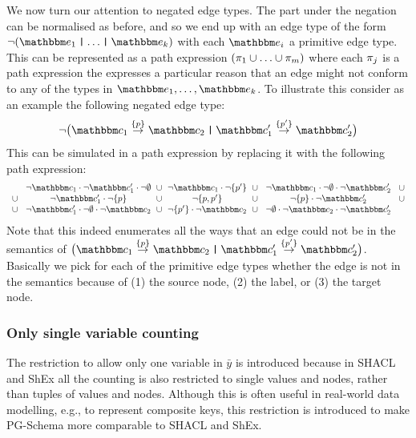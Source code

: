 We now turn our attention to negated edge types. The part under the negation can be normalised as before,
and so we end up with an edge type of the form $\neg (\etype_1 \tOr \ldots \tOr \etype_k)$ with each $\etype_i$ a primitive edge type.
This can be represented as a path expression $(\pi_1 \cup \ldots \cup \pi_{m})$ where each $\pi_j$ is a path expression the expresses a particular reason that an edge might not conform to any of the types in $\etype_1, \ldots, \etype_k$.
To illustrate this consider as an example the following negated edge type:
\[\lnot \big( \et{\ntype_1}{\{ p \}}{\ntype_2} \tOr \et{\ntype'_1}{\{ p' \}}{\ntype'_2} \big)\]
This can be simulated in a path expression by replacing it with the following path expression:
\[\begin{array}{c@{\hspace{6pt}}c@{\hspace{6pt}}c@{\hspace{6pt}}c@{\hspace{6pt}}c@{\hspace{6pt}}c@{\hspace{6pt}}c}
& \lnot\ntype_1\cdot \lnot\ntype'_1 \cdot \lnot\emptyset & \cup &
 \lnot\ntype_1 \cdot \lnot\{p'\} & \cup &
 \lnot\ntype_1 \cdot \lnot\emptyset \cdot \lnot\ntype'_2 & \cup\\
\cup\;  & \lnot\ntype'_1 \cdot \lnot\{p\} & \cup &
\lnot\{p,p'\} & \cup &
  \lnot\{p\} \cdot \lnot\ntype'_2 & \cup\\
\cup \; & \lnot\ntype'_1\cdot  \lnot\emptyset \cdot \lnot\ntype_2 &\cup&
\lnot\{p'\} \cdot \lnot\ntype_2  &\cup &\;
\lnot\emptyset \cdot \lnot\ntype_2 \cdot \lnot\ntype'_2\;
\end{array}\]
Note that this indeed enumerates all the ways that an edge could not be in the semantics of $\big( \et{\ntype_1}{\{ p \}}{\ntype_2} \tOr \et{\ntype'_1}{\{ p' \}}{\ntype'_2} \big)$. Basically we pick for each of the primitive edge types whether the edge is not in the semantics because of (1) the source node, (2) the label, or (3) the target node.


\subsubsection{Only single variable counting}

The restriction to allow only one variable in $\bar{y}$ is introduced because in SHACL and ShEx all the counting is also restricted to single values and nodes, rather than tuples of values and nodes. 
Although this is often useful in real-world data modelling, e.g., to represent composite keys, this restriction is introduced to make PG-Schema more comparable to SHACL and ShEx.

